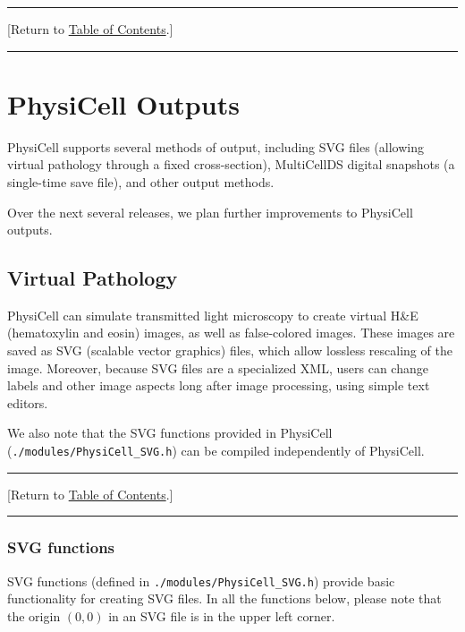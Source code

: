\documentclass[12pt]{article}
\renewcommand{\v}{\verb}
\newcommand{\blue}[1]{\textcolor{blue}{#1}}
\newcommand{\DONE}{}%
\newcommand{\TOClink}{\begin{center}\hrule\vskip-10pt\phantom{.}\hfill[Return to \hyperlink{TOC}{Table of Contents}.]\hfill\phantom{.}\vskip3pt\hrule\end{center}}
\begin{document}
\TOClink 

\section{PhysiCell Outputs \DONE}
\label{sec:Outputs}
PhysiCell supports several methods of output, including 
SVG files (allowing virtual pathology through a fixed cross-section), 
MultiCellDS digital snapshots (a single-time save file), 
and other output methods. 

Over the next several releases, we plan further improvements to 
PhysiCell outputs. 

\subsection{Virtual Pathology} 
\label{sec:Pathology}
PhysiCell can simulate transmitted light microscopy 
to create virtual H\&E (hematoxylin and eosin) images, 
as well as false-colored images. These images 
are saved as SVG (scalable vector graphics) files, 
which allow lossless rescaling of the image. Moreover, 
because SVG files are a specialized XML, users can 
change labels and other image aspects long after image processing, 
using simple text editors. 

We also note that the SVG functions provided in PhysiCell 
(\v|./modules/PhysiCell_SVG.h|) can be compiled independently 
of PhysiCell. 

\TOClink

\subsubsection{SVG functions \DONE}
\label{sec:SVG_functions}
SVG functions (defined in \v|./modules/PhysiCell_SVG.h|) provide basic 
functionality for creating SVG files. In all the functions below, 
please note that the origin $(0,0)$ in an SVG file is in the upper 
left corner. 
\end{document}
